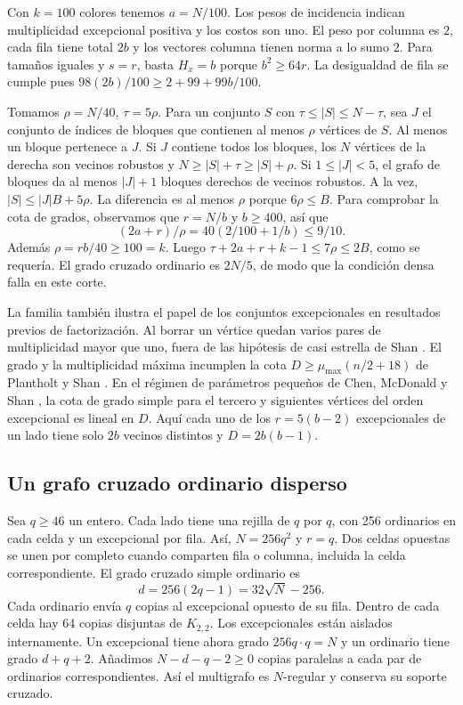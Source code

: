 \documentclass[11pt]{article}
\begin{document}
Con \(k=100\) colores tenemos \(a=N/100\). Los pesos de incidencia indican multiplicidad excepcional positiva y los costos son uno. El peso por columna es \(2\), cada fila tiene total \(2b\) y los vectores columna tienen norma a lo sumo \(2\). Para tamaños iguales y \(s=r\), basta \(H_x=b\) porque \(b^2\ge64r\). La desigualdad de fila se cumple pues \(98(2b)/100\ge 2+99+99b/100\).

Tomamos \(\rho=N/40\), \(\tau=5\rho\). Para un conjunto \(S\) con \(\tau\le|S|\le N-\tau\), sea \(J\) el conjunto de índices de bloques que contienen al menos \(\rho\) vértices de \(S\). Al menos un bloque pertenece a \(J\). Si \(J\) contiene todos los bloques, los \(N\) vértices de la derecha son vecinos robustos y \(N\ge |S|+\tau\ge |S|+\rho\). Si \(1\le |J|<5\), el grafo de bloques da al menos \(|J|+1\) bloques derechos de vecinos robustos. A la vez, \(|S|\le |J|B+5\rho\). La diferencia es al menos \(\rho\) porque \(6\rho\le B\). Para comprobar la cota de grados, observamos que \(r=N/b\) y \(b\ge400\), así que
\[
 (2a+r)/\rho=40(2/100+1/b)\le 9/10.
\]
Además \(\rho=rb/40\ge100=k\). Luego \(\tau+2a+r+k-1\le7\rho\le 2B\), como se requería. El grado cruzado ordinario es \(2N/5\), de modo que la condición densa falla en este corte.

La familia también ilustra el papel de los conjuntos excepcionales en resultados previos de factorización. Al borrar un vértice quedan varios pares de multiplicidad mayor que uno, fuera de las hipótesis de casi estrella de Shan \cite[Teorema~3.1]{Shan}. El grado y la multiplicidad máxima incumplen la cota \(D\ge\mu_{\max}(n/2+18)\) de Plantholt y Shan \cite[Teorema~1.6]{PlantholtShan}. En el régimen de parámetros pequeños de Chen, McDonald y Shan \cite[Teorema~4.2]{CMS}, la cota de grado simple para el tercero y siguientes vértices del orden excepcional es lineal en \(D\). Aquí cada uno de los \(r=5(b-2)\) excepcionales de un lado tiene solo \(2b\) vecinos distintos y \(D=2b(b-1)\).

\subsection{Un grafo cruzado ordinario disperso}\label{sec:grid}

Sea \(q\ge46\) un entero. Cada lado tiene una rejilla de \(q\) por \(q\), con 256 ordinarios en cada celda y un excepcional por fila. Así, \(N=256q^2\) y \(r=q\). Dos celdas opuestas se unen por completo cuando comparten fila o columna, incluida la celda correspondiente. El grado cruzado simple ordinario es
\[
 d=256(2q-1)=32\sqrt N-256 .
\]
Cada ordinario envía \(q\) copias al excepcional opuesto de su fila. Dentro de cada celda hay 64 copias disjuntas de \(K_{2,2}\). Los excepcionales están aislados internamente. Un excepcional tiene ahora grado \(256q\cdot q=N\) y un ordinario tiene grado \(d+q+2\). Añadimos \(N-d-q-2\ge0\) copias paralelas a cada par de ordinarios correspondientes. Así el multigrafo es \(N\)-regular y conserva su soporte cruzado.
\end{document}
